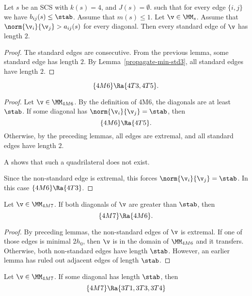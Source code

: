 \begin{lemma}[]
Let $s$ be an SCS with $k(s)=4$, and $J(s)=\emptyset$.
such that for every edge $\{i,j\}$ we have $b_{ij}(s)\le\stab$.
Assume that $m(s)\le 1$.
Let $\v\in \MM_s$.  
Assume that $\norm{\v_i}{\v_j}> a_{ij}(s)$ for every diagonal.
Then every standard edge of $\v$ has length $2$.
\end{lemma}

\begin{proof}
The standard edges are consecutive.
From the previous lemma, some standard edge has length $2$.  By 
Lemma~\ref{propagate-min-std3}, all standard edges have length $2$.
\end{proof}

\begin{lemma}[]
\[
\{4M6\}\Ra \{4T3,4T5\}.
\]
\end{lemma}

\begin{proof} Let $\v\in \MM_{4M6}$.  By the definition of 4M6, the diagonals are at least $\stab$.
If some diagonal has $\norm{\v_i}{\v_j}=\stab$, then
\[
\{4M6\}\Ra\{4T5\}.
\]
Otherwise,
by the preceding lemmas, all edges are extremal, and
all standard edges have length $2$.

A  shows that such a quadrilateral does not exist.

Since the non-standard edge is extremal, this forces $\norm{\v_i}{\v_j}=\stab$.
In this case $\{4M6\}\Ra \{4T3\}$.
\end{proof}

\begin{lemma}[]
Let $\v\in \MM_{4M7}$.  If both diagonals of $\v$ are greater than $\stab$, then
\[
\{4M7\}\Ra \{4M6\}.
\]
\end{lemma}

\begin{proof}
By preceding lemmas, the non-standard edges of $\v$ is extremal.  If one of those
edges is minimal $2h_0$, then $\v$ is in the domain of $\MM_{4M6}$ and it transfers.
Otherwise, both non-standard edges have length $\stab$.  However, an
earlier lemma has ruled out adjacent edges of length $\stab$.
\end{proof}

\begin{lemma}[]
Let $\v\in \MM_{4M7}$.  If some diagonal has length $\stab$, then
\[
\{4M7\}\Ra \{3T1,3T3,3T4\}
\]
\end{lemma}

